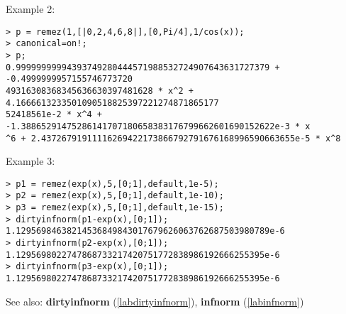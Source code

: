 \noindent Example 2: 
\begin{center}\begin{minipage}{15cm}\begin{Verbatim}[frame=single]
> p = remez(1,[|0,2,4,6,8|],[0,Pi/4],1/cos(x));
> canonical=on!;
> p;
0.99999999994393749280444571988532724907643631727379 + -0.4999999957155746773720
49316308368345636630397481628 * x^2 + 4.1666613233501090518825397221274871865177
52418561e-2 * x^4 + -1.38865291475286141707180658383176799662601690152622e-3 * x
^6 + 2.43726791911116269422173866792791676168996590663655e-5 * x^8
\end{Verbatim}
\end{minipage}\end{center}
\noindent Example 3: 
\begin{center}\begin{minipage}{15cm}\begin{Verbatim}[frame=single]
> p1 = remez(exp(x),5,[0;1],default,1e-5);
> p2 = remez(exp(x),5,[0;1],default,1e-10);
> p3 = remez(exp(x),5,[0;1],default,1e-15);
> dirtyinfnorm(p1-exp(x),[0;1]);
1.12956984638214536849843017679626063762687503980789e-6
> dirtyinfnorm(p2-exp(x),[0;1]);
1.1295698022747868733217420751772838986192666255395e-6
> dirtyinfnorm(p3-exp(x),[0;1]);
1.1295698022747868733217420751772838986192666255395e-6
\end{Verbatim}
\end{minipage}\end{center}
See also: \textbf{dirtyinfnorm} (\ref{labdirtyinfnorm}), \textbf{infnorm} (\ref{labinfnorm})
